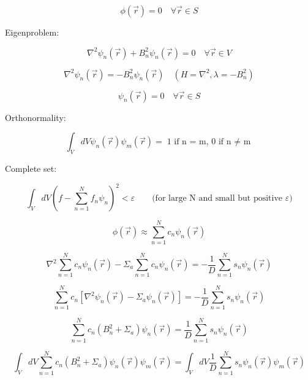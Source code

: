 \documentclass[12pt]{article}
\newcommand{\rvec}{\ensuremath{\vec{r}}}
\begin{document}
\begin{equation*}
\phi(\rvec) = 0 \quad\forall \rvec \in S
\end{equation*}

Eigenproblem:

\begin{equation*}
\nabla^2\psi_n(\rvec) + B_n^2\psi_n(\rvec) = 0 \quad\forall \rvec \in V
\end{equation*}

\begin{equation*}
\nabla^2\psi_n(\rvec) = - B_n^2\psi_n(\rvec) \quad(H = \nabla^2, \lambda = -B_n^2)
\end{equation*}

\begin{equation*}
\psi_n(\rvec) = 0 \quad\forall \rvec \in S
\end{equation*}

Orthonormality:

\begin{equation*}
\int_V dV\psi_n(\rvec)\psi_m(\rvec) = \text{1 if n = m, 0 if n $\neq$ m}
\end{equation*}

Complete set:

\begin{equation*}
\int_V dV\left(f - \sum_{n=1}^N f_n\psi_n\right)^2 < \varepsilon \qquad 
\text{(for large N and small but positive $\varepsilon$)}
\end{equation*}

\begin{equation*}
\phi(\rvec) \approx \sum_{n=1}^N c_n\psi_n(\rvec)
\end{equation*}

\begin{equation*}
\nabla^2\sum_{n=1}^N c_n\psi_n(\rvec) - \Sigma_a\sum_{n=1}^N c_n\psi_n(\rvec) = 
-\frac{1}{D}\sum_{n=1}^N s_n\psi_n(\rvec)
\end{equation*}

\begin{equation*}
\sum_{n=1}^N c_n[\nabla^2\psi_n(\rvec) - \Sigma_a\psi_n(\rvec)]=-\frac{1}{D}\sum_{n=1}^N s_n\psi_n(\rvec)
\end{equation*}

\begin{equation*}
\sum_{n=1}^N c_n(B_n^2 + \Sigma_a)\psi_n(\rvec) = \frac{1}{D}\sum_{n=1}^N s_n\psi_n(\rvec)
\end{equation*}

\begin{equation*}
\int_V dV \sum_{n=1}^N c_n(B_n^2 + \Sigma_a)\psi_n(\rvec)\psi_m(\rvec) = 
\int_V dV \frac{1}{D}\sum_{n=1}^N s_n\psi_n(\rvec)\psi_m(\rvec)
\end{equation*}
\end{document}
